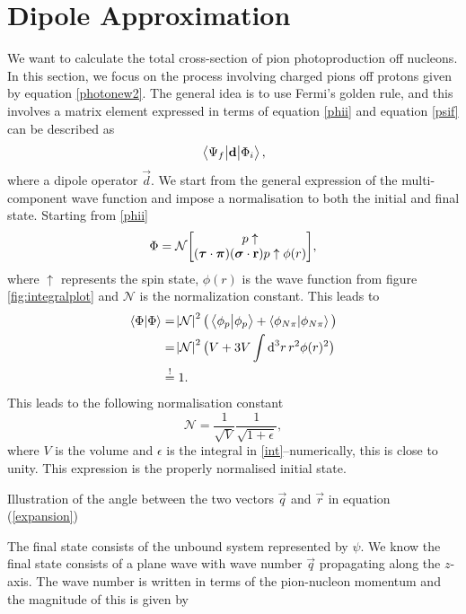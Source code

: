 \section{Dipole Approximation}\label{sec:dipoleapprox}
We want to calculate the total cross-section of pion photoproduction off nucleons. In this section, we focus on the process involving charged pions off protons given by equation \eqref{photonew2}. The general idea is to use Fermi's golden rule, and this involves a matrix element expressed in terms of equation \eqref{phii} and equation \eqref{psif} can be described as
\begin{equation}
	\mel{\Psi_f}{\bm{\mathrm{d}}}{\Phi_i},
\end{equation}
where a dipole operator $\vec{d}$. We start from the general expression of the multi-component wave function and impose a normalisation to both the initial and final state. Starting from \eqref{phii}
\begin{align}\label{finalphi}
	\Phi = \mathcal{N} \mqty[p\uparrow \\ (\vec{\tau}\cdot \vec{\pi})(\vec{\sigma}\cdot \vec{r})p\uparrow \phi(r)],
\end{align}
where $\uparrow$ represents the spin state, $\phi(r)$ is the wave function from figure \ref{fig:integralplot} and $\mathcal{N}$ is the normalization constant. This leads to
\begin{align}
	\braket{\Phi}{\Phi} &= \abs{\mathcal{N}}^2 \big( \braket{\phi_p}{\phi_p}+ \braket{\phi_{N\pi}}{\phi_{N\pi}} \big) \\
	&= \abs{\mathcal{N}}^2 \big( V+3V\int \text{d}^3r \, r^2 \phi(r)^2 \big)\label{int} \\
	&\stackrel{!}{=} 1.
\end{align} 
This leads to the following normalisation constant
\begin{equation}
	\mathcal{N} = \frac{1}{\sqrt{V}}\frac{1}{\sqrt{1+\epsilon}},
\end{equation}
where $V$ is the volume and $\epsilon$ is the integral in \eqref{int}--numerically, this is close to unity. This expression is the properly normalised initial state. 
\begin{marginfigure}
	\centering
	
	\caption{Illustration of the angle between the two vectors $\vec{q}$ and $\vec{r}$ in equation (\ref{expansion})}
	\label{normsphere}
\end{marginfigure}
The final state consists of the unbound system represented by $\psi$. We know the final state consists of a plane wave with wave number $\vec{q}$ propagating along the $z$-axis. The wave number  is written in terms of the pion-nucleon momentum and the magnitude of this is given by
